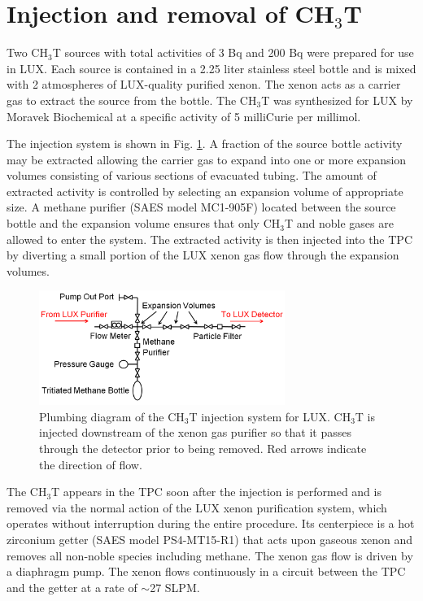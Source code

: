 \section{Injection and removal of CH$_3$T}

Two CH$_3$T sources with total activities of 3 Bq and 200 Bq were prepared for use in LUX. Each source is contained in a 2.25 liter stainless steel bottle and is mixed with 2 atmospheres of LUX-quality purified xenon. The xenon acts as a carrier gas to extract the source from the bottle. The CH$_3$T was synthesized for LUX by Moravek Biochemical \cite{moravek} at a specific activity of 5 milliCurie per millimol.

The injection system is shown in Fig. \ref{fig:plumbing}. A fraction of the source bottle activity may be extracted allowing the carrier gas to expand into one or more expansion volumes consisting of various sections of evacuated tubing. The amount of extracted activity is controlled by selecting an expansion volume of appropriate size. A methane purifier (SAES model MC1-905F) located between the source bottle and the expansion volume ensures that only CH$_3$T and noble gases are allowed to enter the system. The extracted activity is then injected into the TPC by diverting a small portion of the LUX xenon gas flow through the expansion volumes. 

\begin{figure}[h!]\centering
\includegraphics[width=80mm]{fig/TritiumPlumbing.png}
\caption{Plumbing diagram of the CH$_3$T injection system for LUX. CH$_3$T is injected downstream of the xenon gas purifier so that it passes through the detector prior to being removed.  Red arrows indicate the direction of flow.}
\label{fig:plumbing}
\end{figure}

The CH$_3$T appears in the TPC soon after the injection is performed and is removed via the normal action of the LUX xenon purification system, which operates without interruption during the entire procedure. Its centerpiece is a hot zirconium getter (SAES model PS4-MT15-R1) that acts upon gaseous xenon and removes all non-noble species including methane. The xenon gas flow is driven by a diaphragm pump. The xenon flows continuously in a circuit between the TPC and the getter at a rate of $\sim$27 SLPM. 


